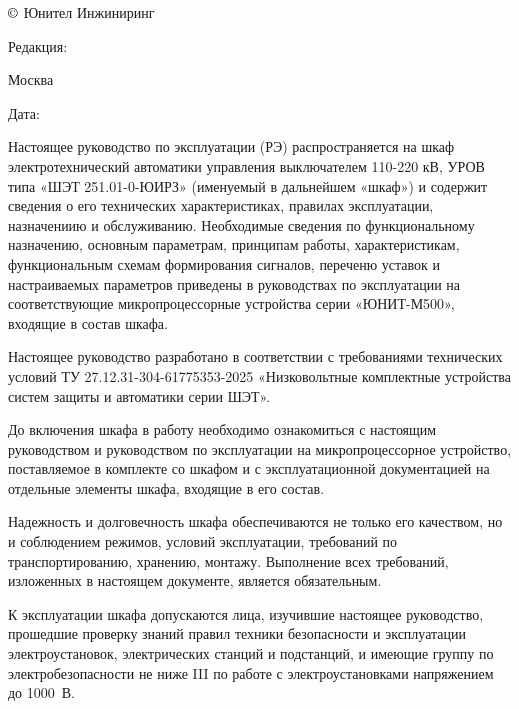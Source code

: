 \pagestyle{fancy}
\fancyhf{}
\renewcommand{\headrulewidth}{1pt}
\lhead{\color{black}{ЮТКБ.656463.300-009 РЭ}}
\chead{\color{black}{Редакция \rev~от~\revdate}}
\rhead{\color{unigreen}\colondevicetype}
\lfoot{\color{unigreen}{Руководство по эксплуатации}}
\rfoot{{\thepage}}
\renewcommand{\footrulewidth}{1pt}


\pagecolor{white}

\noindent
$\copyright$ \the\year{} Юнител Инжиниринг
\hfill
\parbox{0.3\textwidth}{\raggedleft Редакция: \textcolor{unigray}{\rev}}

\vskip 3mm
\noindent
Москва
\hfill
\parbox{0.3\textwidth}{\raggedleft Дата: \textcolor{unigray}{\revdate}}
\vskip 8mm

\vskip 10mm
\par
Настоящее руководство по эксплуатации (РЭ) распространяется на шкаф электротехнический автоматики управления выключателем 110-220 кВ, УРОВ типа «ШЭТ 251.01-0-ЮИРЗ» (именуемый в дальнейшем «шкаф») и содержит сведения о его технических характеристиках, правилах эксплуатации, назначениию и обслуживанию.
Необходимые сведения по функциональному назначению, основным параметрам, принципам работы, характеристикам, функциональным схемам формирования сигналов, переченю уставок и настраиваемых параметров приведены в руководствах по эксплуатации на соответствующие микропроцессорные устройства серии «ЮНИТ-М500», входящие в состав шкафа.
\medskip
\par
Настоящее руководство разработано в соответствии с требованиями технических условий ТУ 27.12.31-304-61775353-2025 «Низковольтные комплектные устройства систем защиты и автоматики серии ШЭТ».
\medskip
\par
До включения шкафа в работу необходимо ознакомиться с настоящим руководством и руководством по эксплуатации на микропроцессорное устройство, поставляемое в комплекте со шкафом и с эксплуатационной документацией на отдельные элементы шкафа, входящие в его состав.
\medskip
\par
Надежность и долговечность шкафа обеспечиваются не только его качеством, но и соблюдением режимов, условий эксплуатации, требований по транспортированию, хранению, монтажу. Выполнение всех требований, изложенных в настоящем документе, является обязательным. 
\medskip
\par
К эксплуатации шкафа допускаются лица, изучившие настоящее руководство, прошедшие проверку знаний правил техники безопасности и эксплуатации электроустановок, электрических станций и подстанций, и имеющие группу по электробезопасности не ниже III по работе с электроустановками напряжением до 1000~В.
\medskip


